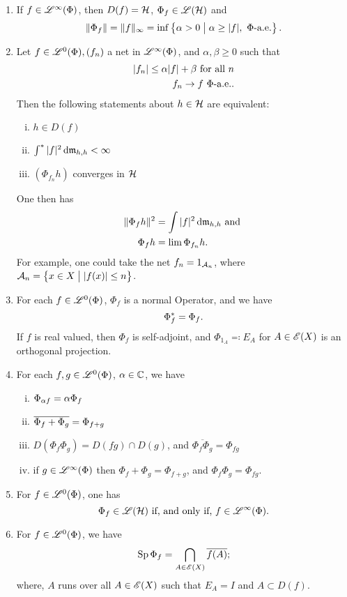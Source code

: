 \begin{thrm}
  \leavevmode
  \begin{enumerate}
   \item   

 If $f \in \mathscr{L}^\infty (\Phi)$, then $D(f) = \mathcal{H}$, $ \Phi_f \in \mathscr{L}(\mathcal{H})$ and
 \[
 \| \Phi_f \| = \| f\|_\infty = \inf \left\lbrace \alpha > 0 \bigm | \alpha \geq |f|, ~\Phi\text{-a.e.}\right\rbrace.
 \]

 
\item 
Let $f \in \mathscr{L}^0(\Phi), (f_n)$ a net in $\mathscr{L}^\infty (\Phi)$, and $\alpha, \beta \geq 0$ such that
 \begin{align*}
   | f_n | \leq \alpha |f| + \beta \text{ for all } n \\
   f_n \to f ~\Phi\text{-a.e.}.
 \end{align*}
Then the following statements about $h \in \mathcal{H}$ are equivalent:
\begin{enumerate}[(i)]
 \item $h \in D(f)$
 \item $\int ^{*} | f| ^2 \operatorname{d}\! \mathfrak{m}_{h,h} < \infty$
 \item $(\Phi_{f_n}h)$ converges in $ \mathcal{H}$
\end{enumerate}
One then has
\begin{align*}
  \| \Phi_f h \| ^2 &= \int |f|^2 \operatorname{d}\! \mathfrak{m}_{h, h } \text{ and }\\
  \Phi_{f }h &= \lim \Phi_{f_n} h.
\end{align*}
For example, one could take the net $f_n = 1_{\mathcal{A}_n}$, where $\mathcal{A}_n = \left\lbrace x \in X \bigm | | f(x) | \leq n \right\rbrace$.

\item
For each $f \in \mathscr{L}^0(\Phi)$, $\Phi_f$ is a normal Operator, and we have
\[
 \Phi_f ^{*} = \Phi_f. 
\]
If $f$ is real valued, then $\Phi_f$ is self-adjoint, and $\Phi_{1_A} \eqqcolon E_A$ for $ A \in \mathscr{E}(X)$ is an orthogonal projection. 

\item 
For each $f, g \in \mathscr{L}^0(\Phi)$, $\alpha \in \mathbb{C}$, we have

\begin{enumerate}[(i)]
  \item $\Phi_{\alpha f} = \alpha \Phi_f$
  \item $ \overline{\Phi_f + \Phi_g} = \Phi_{f + g}$
  \item $D(\Phi_f \Phi_g) = D(fg) \cap D(g)$, and $\overline{\Phi_f \Phi_g} = \Phi_{fg}$
  \item if $g \in \mathscr{L}^\infty (\Phi)$ then $\Phi_f + \Phi_g = \Phi_{f+g}$, and $\Phi_f \Phi_g = \Phi_{fg}$.
\end{enumerate}

\item
For $f \in \mathscr{L}^0(\Phi)$, one has
\[
\Phi_f \in \mathscr{L}(\mathcal{H}) \text{ if, and only if, } f \in \mathscr{L}^\infty (\Phi).
\]

\item
For $f \in \mathscr{L}^0(\Phi)$, we have
\[
\operatorname{Sp} \Phi_f = \bigcap_{A \in \mathscr{E}(X)} \overline{f(A)};
\]
where, $A$ runs over all $A \in \mathscr{E}(X)$ such that $E_A = I$ and $A \subset D(f)$.


\end{enumerate}

\end{thrm}












